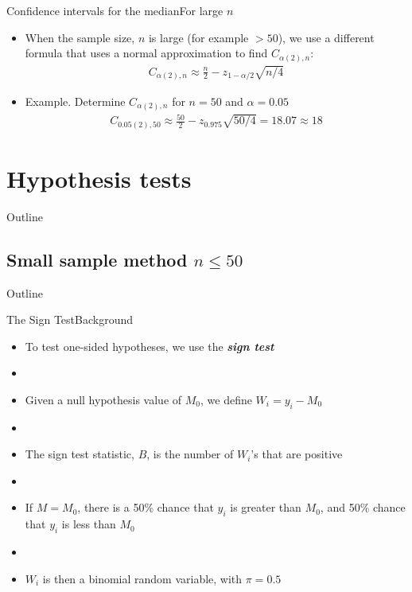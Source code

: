\documentclass[xcolor=dvipsnames]{beamer}
\begin{document}
\begin{frame}{Confidence intervals for the median}{For large $n$}
	\begin{itemize}
		\item When the sample size, $n$ is large (for example $>50$), we use a different formula that uses a normal approximation to find $C_{\alpha(2),n}$:
		\begin{gather*}
		C_{\alpha(2),n} \approx \frac{n}{2} - z_{1-\alpha / 2} \sqrt{n/4}
		\end{gather*} \pause
		\item Example. Determine $C_{\alpha(2),n}$ for $n = 50$ and $\alpha = 0.05$
		\begin{gather*}
		C_{0.05(2),50} \approx \frac{50}{2} - z_{0.975} \sqrt{50/4} = 18.07 \approx 18
		\end{gather*}
	\end{itemize}
\end{frame}

\section{Hypothesis tests}
\begin{frame}{Outline}
\tableofcontents[currentsection,subsectionstyle=show/shaded/hide]
\end{frame}

\subsection{Small sample method $n \leq 50$}
\begin{frame}{Outline}
\tableofcontents[currentsection,subsectionstyle=show/shaded/hide]
\end{frame}

\begin{frame}{The Sign Test}{Background}
	\begin{itemize}
		\item To test one-sided hypotheses, we use the \textbf{\emph{sign test}} \pause
		\item[]
		\item Given a null hypothesis value of $M_0$, we define $W_i = y_i - M_0$ \pause
		\item[]
		\item The sign test statistic, $B$, is the number of $W_i$'s that are positive \pause
		\item[]
		\item If $M = M_0$, there is a 50\% chance that $y_i$ is greater than $M_0$, and 50\% chance that $y_i$ is less than $M_0$ \pause
		\item[]
		\item $W_i$ is then a binomial random variable, with $\pi = 0.5$
	\end{itemize}
\end{frame}
\end{document}
